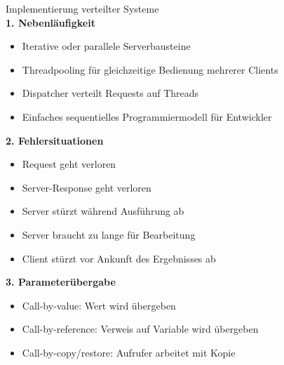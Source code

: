 \begin{KR}{Implementierung verteilter Systeme}\\
\textbf{1. Nebenläufigkeit}
\begin{itemize}
    \item Iterative oder parallele Serverbausteine
    \item Threadpooling für gleichzeitige Bedienung mehrerer Clients
    \item Dispatcher verteilt Requests auf Threads
    \item Einfaches sequentielles Programmiermodell für Entwickler
\end{itemize}

\textbf{2. Fehlersituationen}
\begin{itemize}
    \item Request geht verloren
    \item Server-Response geht verloren
    \item Server stürzt während Ausführung ab
    \item Server braucht zu lange für Bearbeitung
    \item Client stürzt vor Ankunft des Ergebnisses ab
\end{itemize}

\textbf{3. Parameterübergabe}
\begin{itemize}
    \item Call-by-value: Wert wird übergeben
    \item Call-by-reference: Verweis auf Variable wird übergeben  
    \item Call-by-copy/restore: Aufrufer arbeitet mit Kopie
\end{itemize}
\end{KR}





